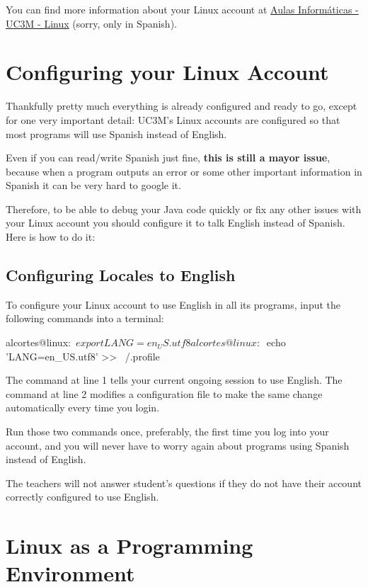 \documentclass[a4paper, 12pt]{article}
\begin{document}
You can find more information about your Linux account at
\href{http://www.aig.uc3m.es/index.php?option=com_content&task=view&id=28&Itemid=49}{Aulas
Informáticas - UC3M - Linux} (sorry, only in Spanish).


\section{Configuring your Linux Account}

Thankfully pretty much everything is already configured and ready to go,
except for one very important detail: UC3M's Linux accounts are configured
so that most programs will use Spanish instead of English.

Even if you can read/write Spanish just fine, \textbf{this is still a mayor
issue}, because when a program outputs an error or some other important
information in Spanish it can be very hard to google it.

Therefore, to be able to debug your Java code quickly or fix any other issues
with your Linux account you should configure it to talk English instead of
Spanish. Here is how to do it:

\subsection{Configuring Locales to English}

To configure your Linux account to use English in all its programs, input the
following commands into a terminal:

\begin{blackboard}
alcortes@linux:~$ export LANG=en_US.utf8
alcortes@linux:~$ echo 'LANG=en_US.utf8' >> ~/.profile
\end{blackboard}

The command at line 1 tells your current ongoing session to use English. The
command at line 2 modifies a configuration file to make the same change
automatically every time you login.

Run those two commands once, preferably, the first time you log into your
account, and you will never have to worry again about programs using Spanish
instead of English.

The teachers will not answer student's questions if they do not have their
account correctly configured to use English.

\section{Linux as a Programming Environment}
\end{document}
